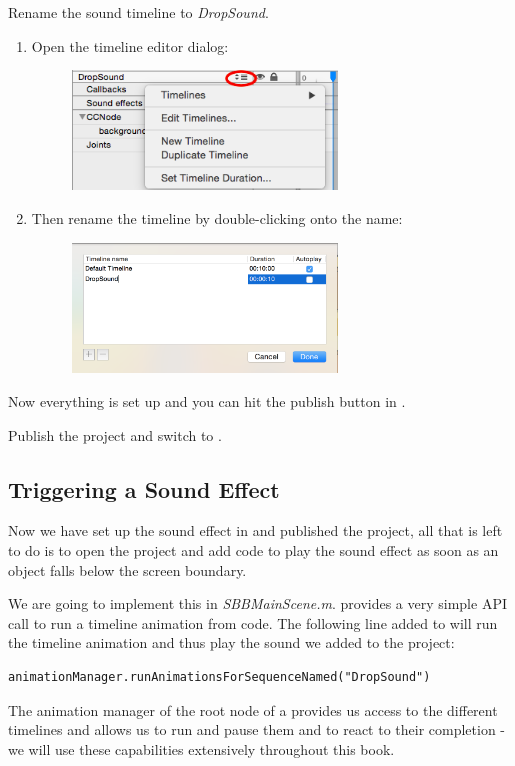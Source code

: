 \begin{leftbar}
Rename the sound timeline to  \textit{DropSound}.
\begin{enumerate}
  \item Open the timeline editor dialog:
  \begin{figure}[H]
    \centering
    \includegraphics[width=200pt]{images/Chapter2/edit_timeline.png}
  \end{figure}
  \item Then rename the timeline by double-clicking onto the name:
  \begin{figure}[H]
    \centering
    \includegraphics[width=200pt]{images/Chapter2/rename_timeline.png}
  \end{figure}
\end{enumerate}

\end{leftbar}

Now everything is set up and you can hit the publish button in \SB{}.

\begin{leftbar}
Publish the \SB{} project and switch to \xcode{}.
\end{leftbar}

\subsection{Triggering a Sound Effect}
Now we have set up the sound effect in \SB{} and published the project, all that
is left to do is to open the \xcode{} project and add code to play the sound
effect as soon as an object falls below the screen boundary.

We are going to implement this in \textit{SBBMainScene.m}. \cocos{} provides a
very simple API call to run a timeline animation from code. The following line
added to  will run the timeline animation and thus play the
sound we added to the project:
\begin{lstlisting}
animationManager.runAnimationsForSequenceNamed("DropSound")
\end{lstlisting}
The animation manager of the root node of a \ccbfile{} provides us access to the
different timelines and allows us to run and pause them and to react to their
completion - we will use these capabilities extensively throughout this book.

